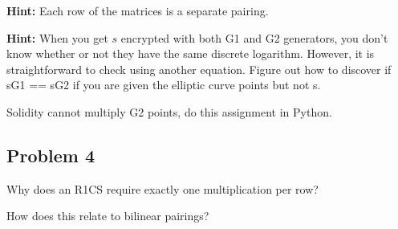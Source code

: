 \documentclass{article}
\begin{document}
\textbf{Hint:} Each row of the matrices is a separate pairing.

\textbf{Hint:} When you get $s$ encrypted with both G1 and G2 generators, you don't know whether or not they have the same discrete logarithm. However, it is straightforward to check using another equation. Figure out how to discover if sG1 == sG2 if you are given the elliptic curve points but not s.

Solidity cannot multiply G2 points, do this assignment in Python.

\subsection*{Problem 4}

Why does an R1CS require exactly one multiplication per row?


How does this relate to bilinear pairings?
\end{document}
